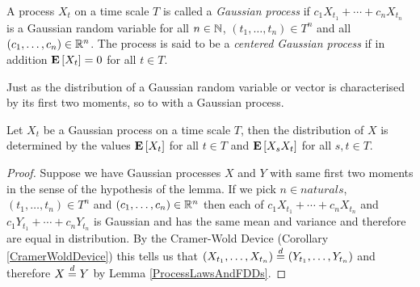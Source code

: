 \begin{defn}A process $X_t$ on a time scale $T$ is called a
  \emph{Gaussian process} if $c_1 X_{t_1} + \dotsb + c_n X_{t_n}$ is a
  Gaussian random variable for all $n \in \mathbb{N}$, $(t_1, \dotsc, t_n) \in T^n$ and
  all $(c_1, \dotsc, c_n) \in \mathbb{R}^n$.  The process is said to be a
  \emph{centered Gaussian process} if in addition $\textbf{E}\left[X_t\right] =
  0$ for all $t \in T$.
\end{defn}

Just as the distribution of a Gaussian random variable or vector is characterised by its
first two moments, so to with a Gaussian process.
\begin{lem}\label{GaussianProcessMoments}Let $X_t$ be a Gaussian process on a time scale $T$, then
  the distribution of $X$ is determined by the values
  $\textbf{E}\left[X_t\right]$ for all $t \in T$ and $\textbf{E}\left[X_s X_t\right]$
  for all $s,t \in T$.
\end{lem}
\begin{proof}
Suppose we have Gaussian processes $X$ and $Y$ with same first two
moments in the sense of the hypothesis of the lemma.  If we pick $n
\in naturals$, $(t_1, \dotsc, t_n) \in T^n$ and $(c_1, \dotsc, c_n)
\in \mathbb{R}^n$ then each of $c_1 X_{t_1} + \dotsb + c_n X_{t_n}$ and
$c_1 Y_{t_1} + \dotsb + c_n Y_{t_n}$ is Gaussian and has the same mean
and variance and therefore are equal in distribution.  By the
Cramer-Wold Device (Corollary \ref{CramerWoldDevice}) this tells us
that $(X_{t_1}, \dotsc , X_{t_n}) \overset{d}= (Y_{t_1}, \dotsc,Y_{t_n})$
and therefore $X \overset{d}= Y$ by Lemma \ref{ProcessLawsAndFDDs}.
\end{proof}

